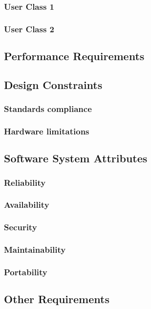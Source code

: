 \documentclass[a4paper,11pt]{report} %
\begin{document}
	\subsubsection{User Class 1}
	
	\subsubsection{User Class 2}
	
	\subsection{Performance Requirements}
	
	\subsection{Design Constraints}
	
	\subsubsection{Standards compliance}
	
	\subsubsection{Hardware limitations}
	
	\subsection{Software System Attributes}
	
	\subsubsection{Reliability}
	
	\subsubsection{Availability}
	
	\subsubsection{Security}
	
	\subsubsection{Maintainability}

	\subsubsection{Portability}
	
	\subsection{Other Requirements}
	
	
\end{document}
